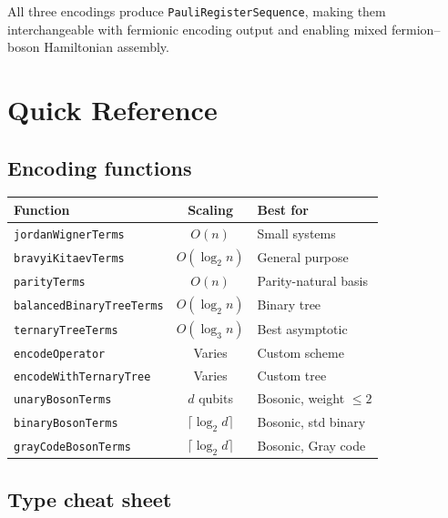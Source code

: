 \documentclass[10pt,a4paper]{article}
\begin{document}
All three encodings produce \texttt{PauliRegisterSequence}, making them
interchangeable with fermionic encoding output and enabling mixed
fermion--boson Hamiltonian assembly.


\section*{Quick Reference}\label{sec:quickref}

\subsection*{Encoding functions}

\begin{center}
\begin{tabular}{lcl}
\toprule
\textbf{Function} & \textbf{Scaling} & \textbf{Best for} \\
\midrule
\texttt{jordanWignerTerms} & $O(n)$ & Small systems \\
\texttt{bravyiKitaevTerms} & $O(\log_2 n)$ & General purpose \\
\texttt{parityTerms} & $O(n)$ & Parity-natural basis \\
\texttt{balancedBinaryTreeTerms} & $O(\log_2 n)$ & Binary tree \\
\texttt{ternaryTreeTerms} & $O(\log_3 n)$ & Best asymptotic \\
\texttt{encodeOperator} & Varies & Custom scheme \\
\texttt{encodeWithTernaryTree} & Varies & Custom tree \\
\texttt{unaryBosonTerms} & $d$ qubits & Bosonic, weight $\leq 2$ \\
\texttt{binaryBosonTerms} & $\lceil\log_2 d\rceil$ & Bosonic, std binary \\
\texttt{grayCodeBosonTerms} & $\lceil\log_2 d\rceil$ & Bosonic, Gray code \\
\bottomrule
\end{tabular}
\end{center}

\subsection*{Type cheat sheet}
\end{document}
